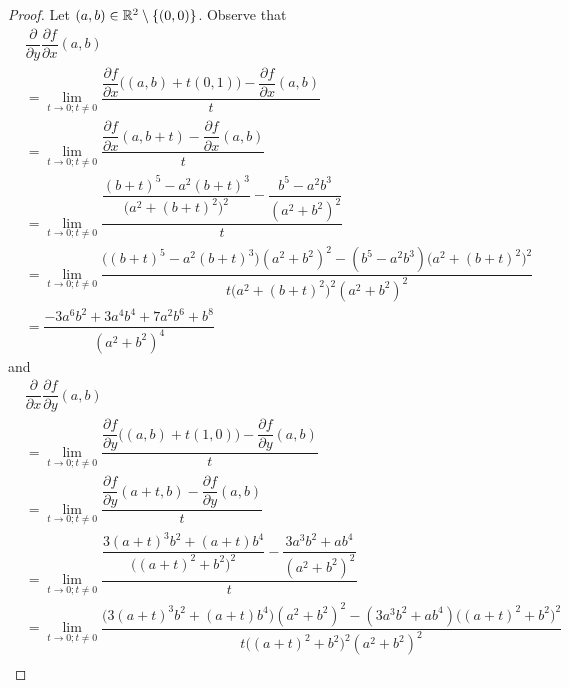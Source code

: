 \begin{proof}
  Let \((a, b) \in \mathbb{R}^2 \setminus \{(0, 0)\}\).
  Observe that
  \begin{align*}
     & \dfrac{\partial}{\partial y} \dfrac{\partial f}{\partial x}(a, b)                                                                                                                \\
     & = \lim_{t \to 0 ; t \neq 0} \dfrac{\dfrac{\partial f}{\partial x}\big((a, b) + t(0, 1)\big) - \dfrac{\partial f}{\partial x}(a, b)}{t}                                           \\
     & = \lim_{t \to 0 ; t \neq 0} \dfrac{\dfrac{\partial f}{\partial x}(a, b + t) - \dfrac{\partial f}{\partial x}(a, b)}{t}                                                           \\
     & = \lim_{t \to 0 ; t \neq 0} \dfrac{\dfrac{(b + t)^5 - a^2 (b + t)^3}{\big(a^2 + (b + t)^2\big)^2} - \dfrac{b^5 - a^2 b^3}{(a^2 + b^2)^2}}{t}                                     \\
     & = \lim_{t \to 0 ; t \neq 0} \dfrac{\big((b + t)^5 - a^2 (b + t)^3\big) (a^2 + b^2)^2 - (b^5 - a^2 b^3) \big(a^2 + (b + t)^2\big)^2}{t \big(a^2 + (b + t)^2\big)^2 (a^2 + b^2)^2} \\
     & = \dfrac{-3 a^6 b^2 + 3 a^4 b^4 + 7 a^2 b^6 + b^8}{(a^2 + b^2)^4}
  \end{align*}
  and
  \begin{align*}
     & \dfrac{\partial}{\partial x} \dfrac{\partial f}{\partial y}(a, b)                                                                                                                        \\
     & = \lim_{t \to 0 ; t \neq 0} \dfrac{\dfrac{\partial f}{\partial y}\big((a, b) + t(1, 0)\big) - \dfrac{\partial f}{\partial y}(a, b)}{t}                                                   \\
     & = \lim_{t \to 0 ; t \neq 0} \dfrac{\dfrac{\partial f}{\partial y}(a + t, b) - \dfrac{\partial f}{\partial y}(a, b)}{t}                                                                   \\
     & = \lim_{t \to 0 ; t \neq 0} \dfrac{\dfrac{3 (a + t)^3 b^2 + (a + t) b^4}{\big((a + t)^2 + b^2\big)^2} - \dfrac{3 a^3 b^2 + a b^4}{(a^2 + b^2)^2}}{t}                                     \\
     & = \lim_{t \to 0 ; t \neq 0} \dfrac{\big(3 (a + t)^3 b^2 + (a + t) b^4\big) (a^2 + b^2)^2 - (3 a^3 b^2 + a b^4) \big((a + t)^2 + b^2\big)^2}{t \big((a + t)^2 + b^2\big)^2 (a^2 + b^2)^2} \\

\end{align*}
\end{proof}
